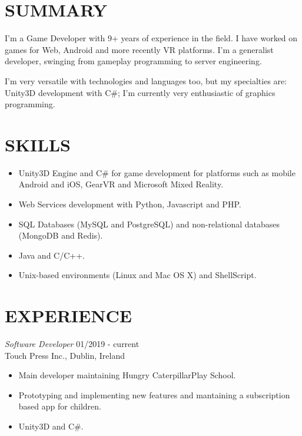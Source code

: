 \documentclass[line,margin]{res}
\begin{document}

\address{56 Phibsboro Rd. - Dublin 7, Dublin, Ireland}
\address{+353 083 486 3449 - bruno@croci.me - \href{https://bruno.croci.me/}{https://bruno.croci.me/}}

 
\begin{resume}
 
\section{SUMMARY} I'm a Game Developer with 9+ years of experience in the field. I have worked on games for Web, Android and more recently VR platforms. I'm a generalist developer, swinging from gameplay programming to server engineering.

I'm very versatile with technologies and languages too, but my specialties are: Unity3D development with C\#; I'm currently very enthusiastic of graphics programming.
 
\section{SKILLS} \begin{itemize}  \itemsep 1.25pt
				 \item Unity3D Engine and C\# for game development for platforms such as mobile Android and iOS, GearVR and Microsoft Mixed Reality.
				 \item Web Services development with Python, Javascript and PHP.
				 \item SQL Databases (MySQL and PostgreSQL) and non-relational databases (MongoDB and Redis).
                 \item Java and C/C++.
                 \item Unix-based environments (Linux and Mac OS X) and ShellScript.
                 \end{itemize}
 
\section{EXPERIENCE} {\sl Software Developer} \hfill 01/2019 - current \\
		Touch Press Inc., Dublin, Ireland
                 \begin{itemize}  \itemsep 1.25pt
                 \item Main developer maintaining Hungry Caterpillar\texttrademark  Play School.
                 \item Prototyping and implementing new features and mantaining a subscription based app for children.
                 \item Unity3D and C\#.
                 \end{itemize}


\end{resume}
\end{document}
